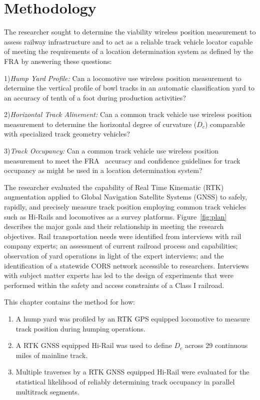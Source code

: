 \chapter{Methodology}
The researcher sought to determine the viability wireless position measurement to assess railway infrastructure and to act as a reliable track vehicle locator capable of meeting the requirements of a location determination system as defined by the FRA by answering these questions:

1)\emph{Hump Yard Profile:}
Can a locomotive use wireless position measurement to determine the vertical profile of bowl tracks in an automatic classification yard to an accuracy of tenth of a foot during production activities?

2)\emph{Horizontal Track Alinement:}
Can a common track vehicle use wireless position measurement to determine the horizontal degree of curvature ($D_c$) comparable with specialized track geometry vehicles?

3)\emph{Track Occupancy:}
Can a common track vehicle use wireless position measurement to meet the FRA~\citep[pp.6-7]{1995FRADiffe} accuracy and confidence guidelines for track occupancy as might be used in a location determination system?

The researcher evaluated the capability of Real Time Kinematic (RTK) augmentation applied to Global Navigation Satellite Systems (GNSS) to safely, rapidly, and precisely measure track position employing common track vehicles such as Hi-Rails and locomotives as a survey platforms. Figure~\ref{fig:plan} describes the major goals and their relationship in meeting the research objectives. Rail transportation needs were identified from interviews with rail company experts; an assessment of current railroad process and capabilities; observation of yard operations in light of the expert interviews; and the identification of a statewide CORS network accessible to researchers. Interviews with subject matter experts has led to the design of experiments that were performed within the safety and access constraints of a Class I railroad.

This chapter contains the method for how:
\begin{enumerate}
	\item A hump yard was profiled by an RTK GPS equipped locomotive to measure track position during humping operations.
	\item A RTK GNSS equipped Hi-Rail was used to define ${D_c}$ across 29 continuous miles of mainline track.
	\item Multiple traverses by a RTK GNSS equipped Hi-Rail were evaluated for the statistical likelihood of reliably determining track occupancy in parallel multitrack segments.
	
\end{enumerate}

